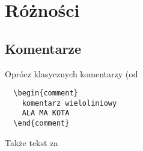 \documentclass[fontSize=10pt, extra]{pdfArticle}
\begin{document}
\section{Różności}

\subsection{Komentarze}
Oprócz klasycznych komentarzy (od \Verb@%
\begin{Verbatim}
  \begin{comment}
    komentarz wieloliniowy
    ALA MA KOTA
  \end{comment}
\end{Verbatim}
Także tekst za \Verb@
\end{document}
